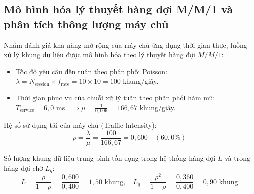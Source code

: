 \begin{table}[H]
\centering
\caption{Kết quả kiểm chứng độ chính xác khứ hồi của chuỗi biến đổi tọa độ trắc địa}
\label{tab:geodetic-roundtrip-precision}
\end{table}

\subsection{Mô hình hóa lý thuyết hàng đợi M/M/1 và phân tích thông lượng máy chủ}

\hspace{0.5cm} Nhằm đánh giá khả năng mở rộng của máy chủ ứng dụng thời gian thực, luồng xử lý khung dữ liệu được mô hình hóa theo lý thuyết hàng đợi $M/M/1$:
\begin{itemize}
    \item Tốc độ yêu cầu đến tuân theo phân phối Poisson: $\lambda = N_{\text{session}} \times f_{\text{rate}} = 10 \times 10 = 100$ khung/giây.
    \item Thời gian phục vụ của chuỗi xử lý tuân theo phân phối hàm mũ: $T_{\text{service}} = 6{,}0$ ms $\implies \mu = \frac{1}{0{,}006} = 166{,}67$ khung/giây.
\end{itemize}

Hệ số sử dụng tải của máy chủ (Traffic Intensity):
\begin{equation}
\rho = \frac{\lambda}{\mu} = \frac{100}{166{,}67} = 0{,}600 \quad (60{,}0\%)
\label{eq:server-traffic-intensity}
\end{equation}

Số lượng khung dữ liệu trung bình tồn đọng trong hệ thống hàng đợi $L$ và trong hàng đợi chờ $L_q$:
\begin{equation}
L = \frac{\rho}{1 - \rho} = \frac{0{,}600}{0{,}400} = 1{,}50 \text{ khung}, \quad L_q = \frac{\rho^2}{1 - \rho} = \frac{0{,}360}{0{,}400} = 0{,}90 \text{ khung}
\label{eq:queue-length-formulas}
\end{equation}

